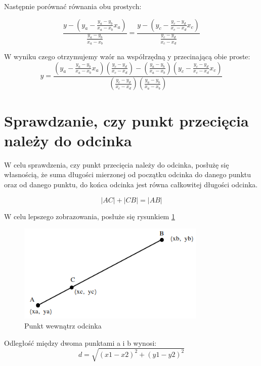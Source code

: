 Następnie porównać równania obu prostych:

\begin{equation}
\frac{y - (y_a - \frac{y_a - y_b}{x_a - x_b}x_a)}{\frac{y_a - y_b}{x_a - x_b}}=\frac{y - (y_c - \frac{y_c - y_d}{x_c - x_d}x_c)}{\frac{y_c - y_d}{x_c - x_d}}
\end{equation}

W wyniku czego otrzymujemy wzór na współrzędną y przecinającą obie proste:
\begin{equation}
y = \frac{(y_a - \frac{y_a - y_b}{x_a - x_b}x_a)(\frac{y_c - y_d}{x_c - x_d}) - (\frac{y_a - y_b}{x_a - x_b})(y_c - \frac{y_c - y_d}{x_c - x_d}x_c)}
{(\frac{y_c - y_d}{x_c - x_d})(\frac{y_a - y_b}{x_a - x_b})}
\end{equation}

\newpage
\section{Sprawdzanie, czy punkt przecięcia należy do odcinka}
\label{sec:SprawdzanieCzyPunktPrzecięciaNależyDoOdcinka}

W celu sprawdzenia, czy punkt przecięcia należy do odcinka, posłużę się własnością, że suma długości mierzonej od początku odcinka do danego punktu oraz od danego punktu, do końca odcinka jest równa całkowitej długości odcinka.

\begin{equation} \label{eq:pointInSegment}
|AC| + |CB| = |AB|
\end{equation}

W celu lepszego zobrazowania, posłuże się rysunkiem \ref{sec:pointSegment}

\begin{figure}[h]
\caption{Punkt wewnątrz odcinka}
\label{sec:pointSegment}
\centering
\includegraphics[width=0.8\textwidth]{pointInSegment}
\end{figure}

Odległość między dwoma punktami a i b wynosi:
\begin{equation}
d = \sqrt{(x1 - x2)^2 + (y1 - y2)^2}
\end{equation}\newline

